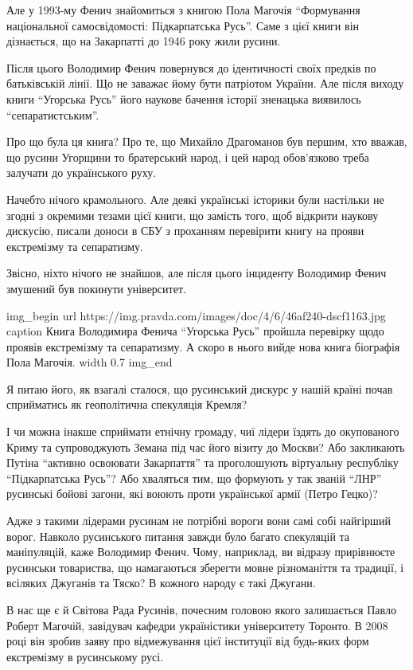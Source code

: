 Але у 1993-му Фенич знайомиться з книгою Пола Магочія \enquote{Формування національної
самосвідомості: Підкарпатська Русь}. Саме з цієї книги він дізнається, що на
Закарпатті до 1946 року жили русини.

Після цього Володимир Фенич повернувся до ідентичності своїх предків по
батьківській лінії. Що не заважає йому бути патріотом України. Але після виходу
книги \enquote{Угорська Русь} його наукове бачення історії зненацька виявилось
\enquote{сепаратистським}.

Про що була ця книга? Про те, що Михайло Драгоманов був першим, хто вважав, що
русини Угорщини \dshM то братерський народ, і цей народ обов’язково треба залучати
до українського руху.

Начебто нічого крамольного. Але деякі українські історики були настільки не
згодні з окремими тезами цієї книги, що замість того, щоб відкрити наукову
дискусію, писали доноси в СБУ з проханням перевірити книгу на прояви
екстремізму та сепаратизму.

Звісно, ніхто нічого не знайшов, але після цього інциденту Володимир Фенич
змушений був покинути університет.

\ifcmt
img_begin 
	url https://img.pravda.com/images/doc/4/6/46af240-dscf1163.jpg
	caption Книга Володимира Фенича \enquote{Угорська Русь} пройшла перевірку щодо проявів екстремізму та сепаратизму. А скоро в нього вийде нова книга \dshM біографія Пола Магочія.
    width 0.7
img_end
\fi

Я питаю його, як взагалі сталося, що русинський дискурс у нашій країні почав
сприйматись як геополітична спекуляція Кремля?

І чи можна інакше сприймати етнічну громаду, чиї лідери їздять до окупованого
Криму та супроводжують Земана під час його візиту до Москви? Або закликають
Путіна \enquote{активно освоювати Закарпаття} та проголошують віртуальну республіку
\enquote{Підкарпатська Русь}? Або хваляться тим, що формують у так званій \enquote{ЛНР}
русинські бойові загони, які воюють проти української армії (Петро Гецко)?

Адже з такими лідерами русинам не потрібні вороги \dshM вони самі собі найгірший
ворог. \dshM Навколо русинського питання завжди було багато спекуляцій та маніпуляцій, \dshM каже Володимир Фенич. \dshM Чому, наприклад, ви відразу прирівнюєте русинськи
товариства, що намагаються зберегти мовне різноманіття та традиції, і всіляких
Джуганів та Тяско? В кожного народу є такі Джугани.

В нас ще є й Світова Рада Русинів, почесним головою якого залишається Павло
Роберт Магочій, завідувач кафедри україністики університету Торонто. В 2008
році він зробив заяву про відмежування цієї інституції від будь-яких форм
екстремізму в русинському русі.

